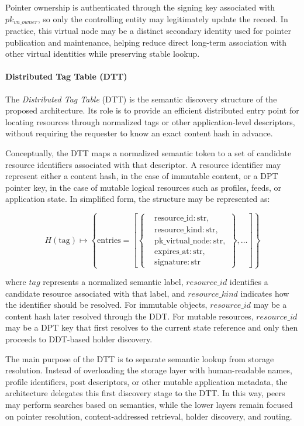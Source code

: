 \documentclass[12pt,a4paper]{article}
\begin{document}
Pointer ownership is authenticated through the signing key associated with \(pk_{vn\_owner}\), so only the controlling entity may legitimately update the record. In practice, this virtual node may be a distinct secondary identity used for pointer publication and maintenance, helping reduce direct long-term association with other virtual identities while preserving stable lookup.


\paragraph{Distributed Tag Table (DTT)}

The \textit{Distributed Tag Table} (DTT) is the semantic discovery structure of the proposed architecture. Its role is to provide an efficient distributed entry point for locating resources through normalized tags or other application-level descriptors, without requiring the requester to know an exact content hash in advance.

Conceptually, the DTT maps a normalized semantic token to a set of candidate resource identifiers associated with that descriptor. A resource identifier may represent either a content hash, in the case of immutable content, or a DPT pointer key, in the case of mutable logical resources such as profiles, feeds, or application state. In simplified form, the structure may be represented as:

\[
H(\mathrm{tag}) \mapsto
\left\{
\mathrm{entries} =
\left[
\left\{
\begin{aligned}
&\mathrm{resource\_id}: \mathrm{str},\\
&\mathrm{resource\_kind}: \mathrm{str},\\
&\mathrm{pk\_virtual\_node}: \mathrm{str},\\
&\mathrm{expires\_at}: \mathrm{str},\\
&\mathrm{signature}: \mathrm{str}
\end{aligned}
\right\},
\ldots
\right]
\right\}
\]

where \(tag\) represents a normalized semantic label, \(resource\_id\) identifies a candidate resource associated with that label, and \(resource\_kind\) indicates how the identifier should be resolved. For immutable objects, \(resource\_id\) may be a content hash later resolved through the DDT. For mutable resources, \(resource\_id\) may be a DPT key that first resolves to the current state reference and only then proceeds to DDT-based holder discovery.

The main purpose of the DTT is to separate semantic lookup from storage resolution. Instead of overloading the storage layer with human-readable names, profile identifiers, post descriptors, or other mutable application metadata, the architecture delegates this first discovery stage to the DTT. In this way, peers may perform searches based on semantics, while the lower layers remain focused on pointer resolution, content-addressed retrieval, holder discovery, and routing.
\end{document}
